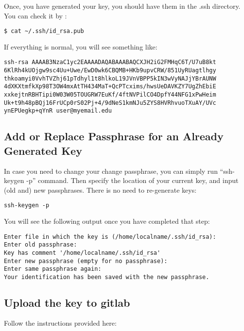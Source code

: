 Once, you have generated your key, you should have them in the .ssh
directory. You can check it by :

\begin{verbatim}
$ cat ~/.ssh/id_rsa.pub
\end{verbatim}

If everything is normal, you will see something like:

\begin{verbatim}
ssh-rsa AAAAB3NzaC1yc2EAAAADAQABAAABAQCXJH2iG2FMHqC6T/U7uB8kt
6KlRh4kUOjgw9sc4Uu+Uwe/EwD0wk6CBQMB+HKb9upvCRW/851UyRUagtlhgy
thkoamyi0VvhTVZhj61pTdhyl1t8hlkoL19JVnVBPP5kIN3wVyNAJjYBrAUNW
4dXKXtmfkXp98T3OW4mxAtTH434MaT+QcPTcxims/hwsUeDAVKZY7UgZhEbiE
xxkejtnRBHTipi0W03W05TOUGRW7EuKf/4ftNVPilCO4DpfY44NFG1xPwHeim
Uk+t9h48pBQj16FrUCp0rS02Pj+4/9dNeS1kmNJu5ZYS8HVRhvuoTXuAY/UVc
ynEPUegkp+qYnR user@myemail.edu
\end{verbatim}

\subsection{Add or Replace Passphrase for an Already Generated
Key}\label{add-or-replace-passphrase-for-an-already-generated-key}

In case you need to change your change passphrase, you can simply run
``ssh-keygen -p'' command. Then specify the location of your current
key, and input (old and) new passphrases. There is no need to
re-generate keys:

\begin{verbatim}
ssh-keygen -p
\end{verbatim}

You will see the following output once you have completed that step:

\begin{verbatim}
Enter file in which the key is (/home/localname/.ssh/id_rsa):
Enter old passphrase:
Key has comment '/home/localname/.ssh/id_rsa'
Enter new passphrase (empty for no passphrase):
Enter same passphrase again:
Your identification has been saved with the new passphrase.  
\end{verbatim}

\subsection{Upload the key to gitlab}\label{upload-the-key-to-gitlab}

Follow the instructions provided here:

